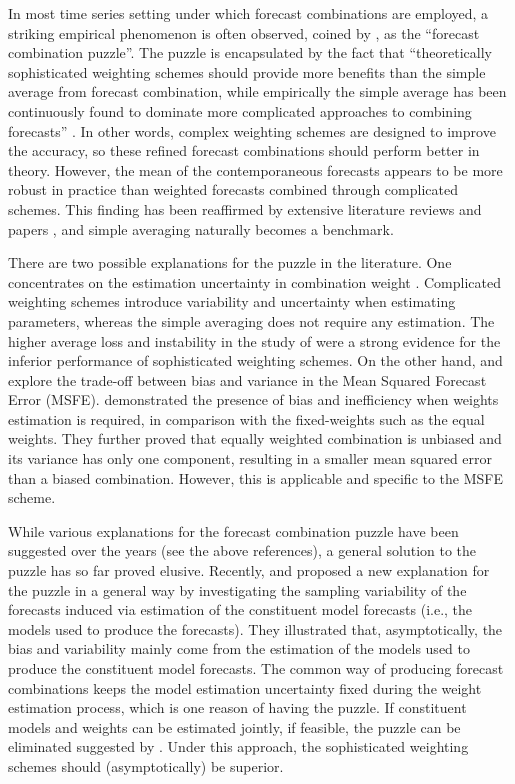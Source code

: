 \documentclass{monashthesis}
\begin{document}
In most time series setting under which forecast combinations are employed, a striking empirical phenomenon is often observed, coined by \textcite{SW04}, as the ``forecast combination puzzle''. The puzzle is encapsulated by the fact that ``theoretically sophisticated weighting schemes should provide more benefits than the simple average from forecast combination, while empirically the simple average has been continuously found to dominate more complicated approaches to combining forecasts'' \autocite{WHLK22}. In other words, complex weighting schemes are designed to improve the accuracy, so these refined forecast combinations should perform better in theory. However, the mean of the contemporaneous forecasts appears to be more robust in practice than weighted forecasts combined through complicated schemes. This finding has been reaffirmed by extensive literature reviews and papers \autocites[e.g.,][]{C89,SW98,SW04,SW09,MSA18,MSA20}, and simple averaging naturally becomes a benchmark.

There are two possible explanations for the puzzle in the literature. One concentrates on the estimation uncertainty in combination weight \autocite{SW98,SW04,SW09}. Complicated weighting schemes introduce variability and uncertainty when estimating parameters, whereas the simple averaging does not require any estimation. The higher average loss and instability in the study of \textcite{SW04} were a strong evidence for the inferior performance of sophisticated weighting schemes. On the other hand, \textcite{E11} and \textcite{CMVW16} explore the trade-off between bias and variance in the Mean Squared Forecast Error (MSFE). \textcite{CMVW16} demonstrated the presence of bias and inefficiency when weights estimation is required, in comparison with the fixed-weights such as the equal weights. They further proved that equally weighted combination is unbiased and its variance has only one component, resulting in a smaller mean squared error than a biased combination. However, this is applicable and specific to the MSFE scheme.

While various explanations for the forecast combination puzzle have been suggested over the years (see the above references), a general solution to the puzzle has so far proved elusive. Recently, \textcite{ZMFP22} and \textcite{FZMP23} proposed a new explanation for the puzzle in a general way by investigating the sampling variability of the forecasts induced via estimation of the constituent model forecasts (i.e., the models used to produce the forecasts). They illustrated that, asymptotically, the bias and variability mainly come from the estimation of the models used to produce the constituent model forecasts. The common way of producing forecast combinations keeps the model estimation uncertainty fixed during the weight estimation process, which is one reason of having the puzzle. If constituent models and weights can be estimated jointly, if feasible, the puzzle can be eliminated suggested by \textcite{FZMP23}. Under this approach, the sophisticated weighting schemes should (asymptotically) be superior.
\end{document}
